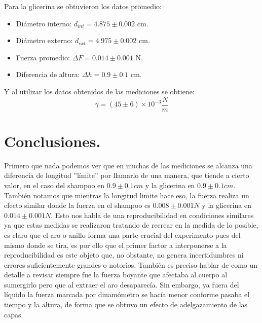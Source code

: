 \documentclass[a4paper]{article}
\begin{document}
Para la glicerina se obtuvieron los datos promedio:
\begin{itemize}
    \item Diámetro interno: $d_{int} = 4.875\pm0.002$ cm.
    \item Diámetro externo: $d_{ext} = 4.975\pm0.002$ cm.
    \item Fuerza promedio: $\Delta F = 0.014\pm0.001$ N.
    \item Diferencia de altura: $\Delta h = 0.9\pm0.1$ cm.
\end{itemize}

Y al utilizar los datos obtenidos de las mediciones se obtiene:
$$\gamma = (45\pm 6)\times10^{-3}  \frac{N}{m}$$

\section*{Conclusiones.}
Primero que nada podemos ver que en muchas de las mediciones se alcanza una diferencia de longitud ''límite'' por llamarlo de una manera, que tiende a cierto valor, en el caso del shampoo en $0.9\pm0.1 cm$ y la glicerina en $0.9\pm0.1 cm$. También notamos que mientras la longitud limite hace eso, la fuerza realiza un efecto similar donde la fuerza en el shampoo es $0.008\pm0.001 N$ y la glicerina en $0.014\pm0.001 N$. Esto nos habla de una reproducibilidad en condiciones similares ya que estas medidas se realizaron  tratando de recrear en la medida de lo posible, es claro que el aro o anillo forma una parte crucial del experimento pues del mismo donde se tira, es por ello que el primer factor a interponerse a la reproducibilidad es este objeto que, no obstante, no genera incertidumbres ni errores suficientemente grandes o notorios. También es preciso hablar de como un detalle a revisar siempre fue la fuerza boyante que afectaba al cuerpo al sumergirlo pero que al extraer el aro desaparecía. Sin embargo, ya fuera del líquido la fuerza marcada por dinamómetro se hacía menor conforme pasaba el tiempo y la altura, de forma que se obtuvo un efecto de adelgazamiento de las capas.
\end{document}
